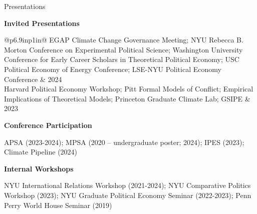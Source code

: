 \documentclass{resume} %
\begin{document}
\begin{rSection}{Presentations}

\textbf{Invited Presentations}

\begin{table}[!htbp]
    \centering
    \begin{tabular}{@{\hspace*{2em}}p{6.9in}p{1in}@}
    EGAP Climate Change Governance Meeting; NYU  Rebecca B. Morton Conference on Experimental Political Science;  Washington University Conference for Early Career Scholars in Theoretical Political Economy; USC Political Economy of Energy Conference; LSE-NYU Political Economy Conference & 2024\\
      Harvard Political Economy Workshop; Pitt Formal Models of Conflict; Empirical Implications of Theoretical Models; Princeton Graduate Climate Lab; GSIPE    & 2023 
    \end{tabular}
\end{table}
\textbf{Conference Participation}

\hspace*{0.5em} APSA (2023-2024);  MPSA (2020 -- undergraduate poster; 2024); IPES (2023);  Climate Pipeline (2024)

\textbf{Internal Workshops}

\hspace*{0.5em} NYU International Relations Workshop (2021-2024); NYU Comparative Politics Workshop (2023); NYU Graduate Political Economy Seminar (2022-2023); Penn Perry World House Seminar (2019)
\end{rSection}
\end{document}
